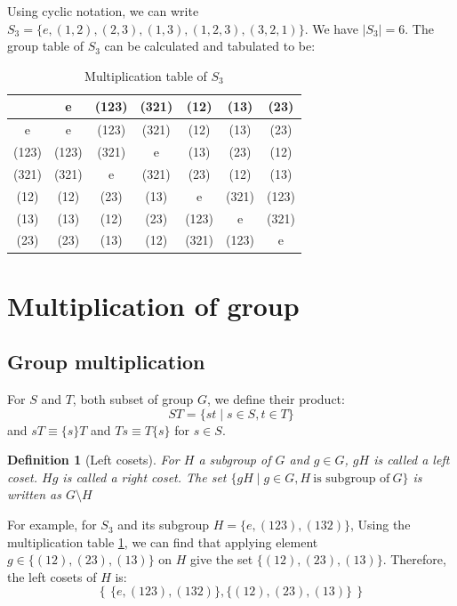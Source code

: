 \documentclass{amsart}
\newtheorem{definition}{Definition}
\begin{document}
Using cyclic notation, we can write $S_3 = \{ e, (1,2), (2,3), (1,3), (1,2,3), (3,2,1) \}$. We have $|S_3| = 6$. The group table of $S_3$ can be calculated 
and tabulated to be:
\begin{table}[h]
    \centering
    \caption{Multiplication table of $S_3$}
    \begin{tabular}{|c|ccc|ccc|}
        \hline
                & e     & (123) & (321) & (12)  & (13)  & (23)  \\ \hline
           e    & e     & (123) & (321) & (12)  & (13)  & (23)  \\ 
          (123) & (123) & (321) & e     & (13)  & (23)  & (12)  \\
          (321) & (321) & e     & (321) & (23)  & (12)  & (13)  \\ \hline
          (12)  & (12)  & (23)  & (13)  &     e & (321) & (123) \\
          (13)  & (13)  & (12)  & (23)  & (123) & e     & (321) \\
          (23)  & (23)  & (13)  & (12)  & (321) & (123) & e     \\ \hline
    \end{tabular}
    \label{T:s3}
\end{table}

\section{Multiplication of group} 

\subsection*{Group multiplication}
For $S$ and $T$, both subset of group $G$, we define their product:
\begin{equation}
    ST = \{st\mid s\in S, t \in T\}
\end{equation}
and $sT \equiv \{s\}T $ and $Ts \equiv T\{s\} $ for $s \in S$.

\vspace{10pt}

\begin{definition}[Left cosets]
    For $H$ a subgroup of $G$ and $g \in G$, $gH$ is called a left coset. $Hg$ is called a right coset. 
    The set $\{gH \mid g \in G, H\ \text{is subgroup of}\ G\}$ is written as $G\setminus H$
\end{definition}

For example, for $S_3$ and its subgroup $H = \{e,(123),(132)\}$, 
Using the multiplication table \ref{T:s3}, we can find that
applying element $g \in \{(12), (23), (13)\}$ on $H$
give the set $\{(12), (23), (13)\}$. Therefore, the left cosets of $H$ is:
\[
    \left\{\, \{e,(123),(132)\}, \{(12), (23), (13)\}\, \right\}    
\]
\end{document}
